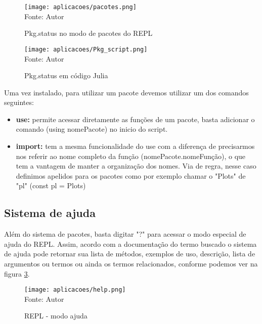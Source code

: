 \begin{figure}[H]
\begin{center}
    \caption{Pkg.status no modo de pacotes do REPL} 
    \label{pacotes}
    \texttt{[image: aplicacoes/pacotes.png]} \\
    {\tiny \sf Fonte: Autor}
\end{center}
\end{figure} 
\begin{figure}[H]
\begin{center}
    \caption{Pkg.status em código Julia} 
    \label{Pkg_script}
    \texttt{[image: aplicacoes/Pkg\_script.png]} \\
    {\tiny \sf Fonte: Autor}
\end{center}
\end{figure} 

Uma vez instalado, para utilizar um pacote devemos utilizar um dos comandos seguintes:
\begin{itemize}
  \item \textbf{use:} permite acessar diretamente as funções de um pacote, basta adicionar o comando (using nomePacote) no inicio do script. 
  \item \textbf{import:} tem a mesma funcionalidade do use com a diferença de precisarmos nos referir ao nome completo da função (nomePacote.nomeFunção), o que tem a vantagem de manter a organização dos nomes. Via de regra, nesse caso definimos apelidos para os pacotes como por exemplo chamar o "Plots" de "pl" (const pl = Plots) %
\end{itemize}


\subsection{Sistema de ajuda}
Além do sistema de pacotes, basta digitar "?"  para acessar o modo especial de ajuda do REPL. Assim, acordo com a documentação do termo buscado o sistema de ajuda pode retornar sua lista de métodos, exemplos de uso, descrição, lista de argumentos ou termos ou ainda os termos relacionados, conforme podemos ver na figura \ref{ajuda}. 
    \begin{figure}[H]
    \begin{center}
        \caption{REPL - modo ajuda} \label{ajuda}
        \texttt{[image: aplicacoes/help.png]} \\
        {\tiny \sf Fonte: Autor}
    \end{center}
    \end{figure} 

